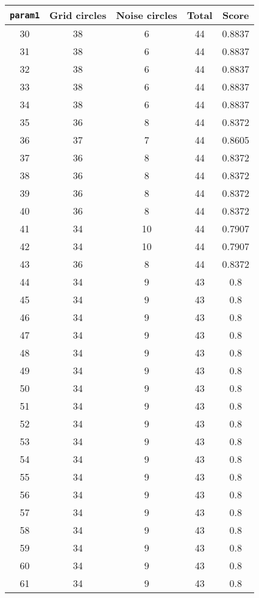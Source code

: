 \documentclass[letterpaper, 12pt]{article}
\begin{document}
\begin{longtable}{|c|c|c|c|c|}
\hline
\textbf{\texttt{param1}} & \textbf{Grid circles} & \textbf{Noise circles} & \textbf{Total} & \textbf{Score} \\
\hline
30 & 38 & 6 & 44 & 0.8837 \\
\hline
31 & 38 & 6 & 44 & 0.8837 \\
\hline
32 & 38 & 6 & 44 & 0.8837 \\
\hline
33 & 38 & 6 & 44 & 0.8837 \\
\hline
34 & 38 & 6 & 44 & 0.8837 \\
\hline
35 & 36 & 8 & 44 & 0.8372 \\
\hline
36 & 37 & 7 & 44 & 0.8605 \\
\hline
37 & 36 & 8 & 44 & 0.8372 \\
\hline
38 & 36 & 8 & 44 & 0.8372 \\
\hline
39 & 36 & 8 & 44 & 0.8372 \\
\hline
40 & 36 & 8 & 44 & 0.8372 \\
\hline
41 & 34 & 10 & 44 & 0.7907 \\
\hline
42 & 34 & 10 & 44 & 0.7907 \\
\hline
43 & 36 & 8 & 44 & 0.8372 \\
\hline
44 & 34 & 9 & 43 & 0.8 \\
\hline
45 & 34 & 9 & 43 & 0.8 \\
\hline
46 & 34 & 9 & 43 & 0.8 \\
\hline
47 & 34 & 9 & 43 & 0.8 \\
\hline
48 & 34 & 9 & 43 & 0.8 \\
\hline
49 & 34 & 9 & 43 & 0.8 \\
\hline
50 & 34 & 9 & 43 & 0.8 \\
\hline
51 & 34 & 9 & 43 & 0.8 \\
\hline
52 & 34 & 9 & 43 & 0.8 \\
\hline
53 & 34 & 9 & 43 & 0.8 \\
\hline
54 & 34 & 9 & 43 & 0.8 \\
\hline
55 & 34 & 9 & 43 & 0.8 \\
\hline
56 & 34 & 9 & 43 & 0.8 \\
\hline
57 & 34 & 9 & 43 & 0.8 \\
\hline
58 & 34 & 9 & 43 & 0.8 \\
\hline
59 & 34 & 9 & 43 & 0.8 \\
\hline
60 & 34 & 9 & 43 & 0.8 \\
\hline
61 & 34 & 9 & 43 & 0.8 \\

\end{longtable}
\end{document}
